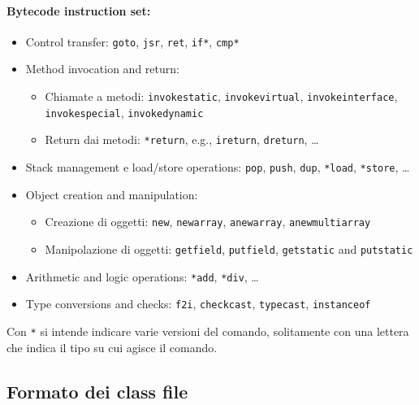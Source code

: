\paragraph{Bytecode instruction set:}
\begin{itemize}
    \item Control transfer: \texttt{goto}, \texttt{jsr}, \texttt{ret}, \texttt{if*}, \texttt{cmp*}

    \item Method invocation and return:
    \begin{itemize}
        \item Chiamate a metodi: \texttt{invokestatic}, \texttt{invokevirtual}, \texttt{invokeinterface}, \texttt{invokespecial}, \texttt{invokedynamic}

        \item Return dai metodi: \texttt{*return}, e.g., \texttt{ireturn}, \texttt{dreturn}, \dots
    \end{itemize}

    \item Stack management e load/store operations: \texttt{pop}, \texttt{push}, \texttt{dup}, \texttt{*load}, \texttt{*store}, \dots

    \item Object creation and manipulation:
    \begin{itemize}
        \item Creazione di oggetti: \texttt{new}, \texttt{newarray}, \texttt{anewarray}, \texttt{anewmultiarray}

        \item Manipolazione di oggetti: \texttt{getfield}, \texttt{putfield}, \texttt{getstatic} and \texttt{putstatic}
    \end{itemize}

    \item Arithmetic and logic operations: \texttt{*add}, \texttt{*div}, \dots

    \item Type conversions and checks: \texttt{f2i}, \texttt{checkcast}, \texttt{typecast}, \texttt{instanceof}
\end{itemize}

Con \texttt{*} si intende indicare varie versioni del comando, solitamente con una lettera che indica il tipo su cui agisce il comando.

\subsection{Formato dei class file}

